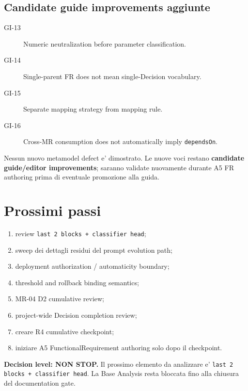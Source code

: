 \documentclass[11pt,a4paper]{article}
\begin{document}
\subsection{Candidate guide improvements aggiunte}
\begin{description}
  \item[GI-13] Numeric neutralization before parameter classification.
  \item[GI-14] Single-parent FR does not mean single-Decision vocabulary.
  \item[GI-15] Separate mapping strategy from mapping rule.
  \item[GI-16] Cross-MR consumption does not automatically imply \texttt{dependsOn}.
\end{description}

\begin{ddtaprinciple}[title={Methodology disposition}]
Nessun nuovo metamodel defect e' dimostrato. Le nuove voci restano \textbf{candidate guide/editor improvements}; saranno validate nuovamente durante A5 FR authoring prima di eventuale promozione alla guida.
\end{ddtaprinciple}

\section{Prossimi passi}
\begin{enumerate}
  \item review \texttt{last 2 blocks + classifier head};
  \item sweep dei dettagli residui del prompt evolution path;
  \item deployment authorization / automaticity boundary;
  \item threshold and rollback binding semantics;
  \item MR-04 D2 cumulative review;
  \item project-wide Decision completion review;
  \item creare R4 cumulative checkpoint;
  \item iniziare A5 FunctionalRequirement authoring solo dopo il checkpoint.
\end{enumerate}

\begin{ddtaopen}[title={STOP condition corrente}]
\textbf{Decision level: NON STOP.} Il prossimo elemento da analizzare e' \texttt{last 2 blocks + classifier head}. La Base Analysis resta bloccata fino alla chiusura del documentation gate.
\end{ddtaopen}
\end{document}
